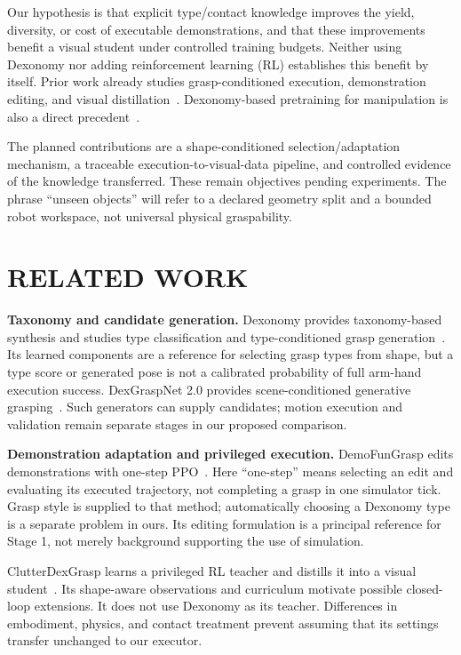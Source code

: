 \documentclass[letterpaper, 10 pt, conference]{ieeeconf}
\begin{document}
Our hypothesis is that explicit type/contact knowledge improves the yield,
diversity, or cost of executable demonstrations, and that these improvements
benefit a visual student under controlled training budgets. Neither using
Dexonomy nor adding reinforcement learning (RL) establishes this benefit by
itself. Prior work already studies grasp-conditioned execution, demonstration
editing, and visual distillation~\cite{unidexgrasp,demofungrasp,clutterdexgrasp}.
Dexonomy-based pretraining for manipulation is also a direct
precedent~\cite{fromgraspstodexterity}.

The planned contributions are a shape-conditioned selection/adaptation mechanism,
a traceable execution-to-visual-data pipeline, and controlled evidence of the
knowledge transferred. These remain objectives pending experiments. The phrase
``unseen objects'' will refer to a declared geometry split and a bounded robot
workspace, not universal physical graspability.

\section{RELATED WORK}
\textbf{Taxonomy and candidate generation.}
Dexonomy provides taxonomy-based synthesis and studies type classification and
type-conditioned grasp generation~\cite{dexonomy}. Its learned components are a
reference for selecting grasp types from shape, but a type score or generated
pose is not a calibrated probability of full arm-hand execution success.
DexGraspNet 2.0 provides scene-conditioned generative grasping~\cite{dexgraspnet2}.
Such generators can supply candidates; motion execution and validation remain
separate stages in our proposed comparison.

\textbf{Demonstration adaptation and privileged execution.}
DemoFunGrasp edits demonstrations with one-step PPO~\cite{demofungrasp}. Here
``one-step'' means selecting an edit and evaluating its executed trajectory,
not completing a grasp in one simulator tick. Grasp style is supplied to that
method; automatically choosing a Dexonomy type is a separate problem in ours.
Its editing formulation is a principal reference for Stage 1, not merely
background supporting the use of simulation.

ClutterDexGrasp learns a privileged RL teacher and distills it into a visual
student~\cite{clutterdexgrasp}. Its shape-aware observations and curriculum
motivate possible closed-loop extensions. It does not use Dexonomy as its
teacher. Differences in embodiment, physics, and contact treatment prevent
assuming that its settings transfer unchanged to our executor.
\end{document}
